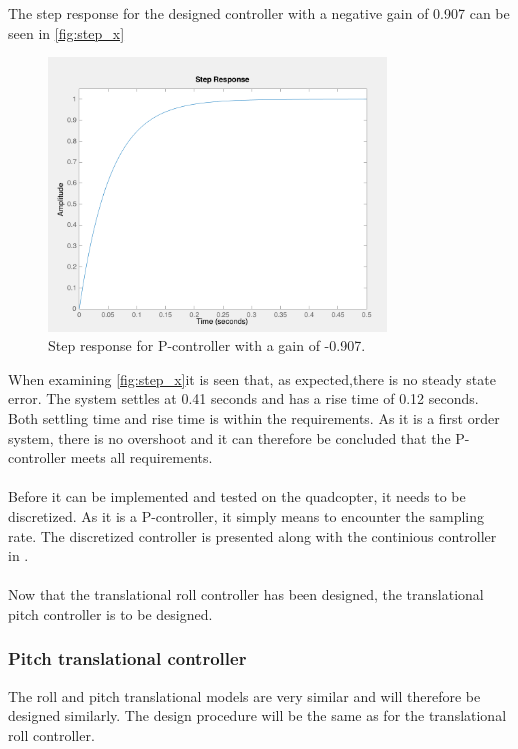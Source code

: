 The step response for the designed controller with a negative gain of 0.907 can be seen in \autoref{fig:step_x}
\begin{figure}[H]
	\centering
	\includegraphics[width=0.8\textwidth]{figures/step_x.png}
	\caption{Step response for P-controller with a gain of -0.907.}\label{fig:step_x}
\end{figure}
When examining \autoref{fig:step_x}it is seen that, as expected,there is no steady state error. The system settles at 0.41 seconds and has a rise time of 0.12 seconds. Both settling time and rise time is within the requirements. As it is a first order system, there is no overshoot and it can therefore be concluded that the P-controller meets all requirements.
\\
\\
Before it can be implemented and tested on the quadcopter, it needs to be discretized. As it is a P-controller, it simply means to encounter the sampling rate. The discretized controller is presented along with the continious controller in .
\\ \\
Now that the translational roll controller has been designed, the translational pitch controller is to be designed.  
\subsubsection*{Pitch translational controller}
The roll and pitch translational models are very similar and will therefore be designed similarly. The design procedure will be the same as for the translational roll controller.\\

